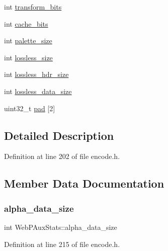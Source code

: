 \begin{DoxyCompactItemize}
\item 
int \mbox{\hyperlink{struct_web_p_aux_stats_a5bbb98600ce3b08356be01b72b8c3d9c}{transform\+\_\+bits}}
\item 
int \mbox{\hyperlink{struct_web_p_aux_stats_ae00af51edd1e20f2ea547b3d25e664f6}{cache\+\_\+bits}}
\item 
int \mbox{\hyperlink{struct_web_p_aux_stats_aecb02bd799deeee569191f1ed74ffbd6}{palette\+\_\+size}}
\item 
int \mbox{\hyperlink{struct_web_p_aux_stats_a0a00a0cbdefab6980b0da75a4f5f0487}{lossless\+\_\+size}}
\item 
int \mbox{\hyperlink{struct_web_p_aux_stats_a4e84056d2dd69f63421afbcf2891c4b5}{lossless\+\_\+hdr\+\_\+size}}
\item 
int \mbox{\hyperlink{struct_web_p_aux_stats_a55e41718c2104c948f41c56d69144c6f}{lossless\+\_\+data\+\_\+size}}
\item 
uint32\+\_\+t \mbox{\hyperlink{struct_web_p_aux_stats_a96fb93805010de950a71ed7a372d51c4}{pad}} \mbox{[}2\mbox{]}
\end{DoxyCompactItemize}


\subsection{Detailed Description}


Definition at line 202 of file encode.\+h.



\subsection{Member Data Documentation}
\mbox{\label{struct_web_p_aux_stats_afeeb0a0edcf5283ff687e00947e31f5b}} 
\subsubsection{\texorpdfstring{alpha\_data\_size}{alpha\_data\_size}}
{\footnotesize\ttfamily int Web\+P\+Aux\+Stats\+::alpha\+\_\+data\+\_\+size}



Definition at line 215 of file encode.\+h.

\mbox{\label{struct_web_p_aux_stats_a6eb29c280d65aaeaba47ee3c1f7cda46}} 
